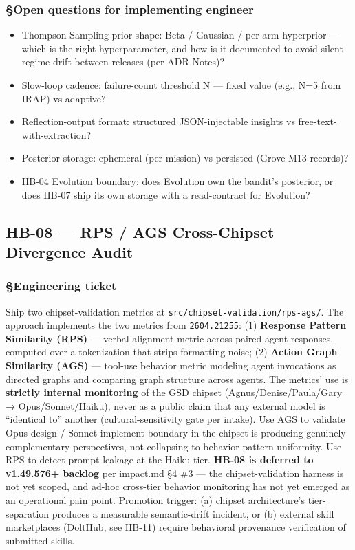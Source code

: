 \documentclass[11pt,letterpaper]{article}
\newcommand{\arxivid}[1]{\texttt{\textcolor{accent}{#1}}}
\providecommand{\tightlist}{\setlength{\itemsep}{0pt}\setlength{\parskip}{0pt}}
\begin{document}
\subsubsection{§Open questions for implementing
engineer}

\begin{itemize}
\tightlist
\item
  Thompson Sampling prior shape: Beta / Gaussian / per-arm hyperprior
  --- which is the right hyperparameter, and how is it documented to
  avoid silent regime drift between releases (per ADR Notes)?
\item
  Slow-loop cadence: failure-count threshold N --- fixed value (e.g.,
  N=5 from IRAP) vs adaptive?
\item
  Reflection-output format: structured JSON-injectable insights vs
  free-text-with-extraction?
\item
  Posterior storage: ephemeral (per-mission) vs persisted (Grove M13
  records)?
\item
  HB-04 Evolution boundary: does Evolution own the bandit's posterior,
  or does HB-07 ship its own storage with a read-contract for Evolution?
\end{itemize}


\subsection{HB-08 — RPS / AGS Cross-Chipset Divergence Audit}
\subsubsection{§Engineering ticket}

Ship two chipset-validation metrics at
\texttt{src/chipset-validation/rps-ags/}. The approach implements the
two metrics from \arxivid{2604.21255}: (1) \textbf{Response Pattern
Similarity (RPS)} --- verbal-alignment metric across paired agent
responses, computed over a tokenization that strips formatting noise;
(2) \textbf{Action Graph Similarity (AGS)} --- tool-use behavior metric
modeling agent invocations as directed graphs and comparing graph
structure across agents. The metrics' use is \textbf{strictly internal
monitoring} of the GSD chipset (Agnus/Denise/Paula/Gary →
Opus/Sonnet/Haiku), never as a public claim that any external model is
``identical to'' another (cultural-sensitivity gate per intake). Use AGS
to validate Opus-design / Sonnet-implement boundary in the chipset is
producing genuinely complementary perspectives, not collapsing to
behavior-pattern uniformity. Use RPS to detect prompt-leakage at the
Haiku tier. \textbf{HB-08 is deferred to v1.49.576+ backlog} per
impact.md §4 \#3 --- the chipset-validation harness is not yet scoped,
and ad-hoc cross-tier behavior monitoring has not yet emerged as an
operational pain point. Promotion trigger: (a) chipset architecture's
tier-separation produces a measurable semantic-drift incident, or (b)
external skill marketplaces (DoltHub, see HB-11) require behavioral
provenance verification of submitted skills.
\end{document}
